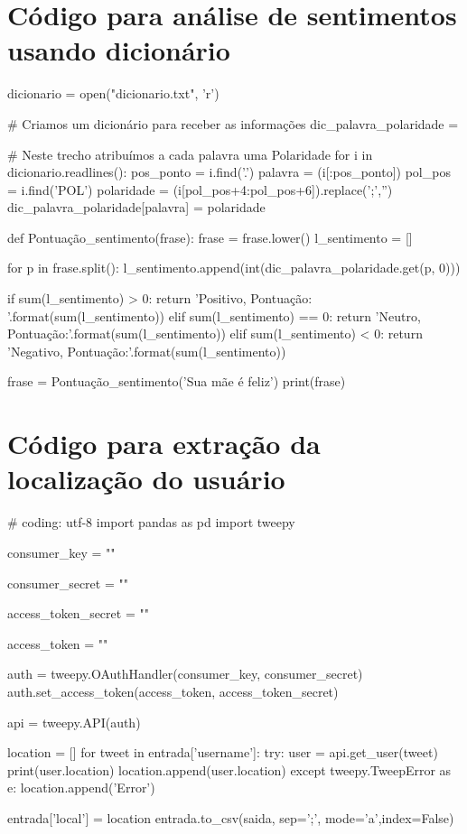 \section{Código para análise de sentimentos usando dicionário}
\label{cod:analise}

\begin{python}

dicionario = open("dicionario.txt", 'r')

# Criamos um dicionário para receber as informações
dic_palavra_polaridade = {} 

# Neste trecho atribuímos a cada palavra uma Polaridade
for i in dicionario.readlines(): 
    pos_ponto = i.find('.')
    palavra = (i[:pos_ponto])
    pol_pos = i.find('POL')
    polaridade = (i[pol_pos+4:pol_pos+6]).replace(';','')
    dic_palavra_polaridade[palavra] = polaridade


def Pontuação_sentimento(frase):
    frase = frase.lower()
    l_sentimento = []

    for p in frase.split():
        l_sentimento.append(int(dic_palavra_polaridade.get(p, 0)))

    if sum(l_sentimento) > 0:
        return 'Positivo, Pontuação: {}'.format(sum(l_sentimento))
    elif sum(l_sentimento) == 0:
        return 'Neutro, Pontuação:{}'.format(sum(l_sentimento))
    elif sum(l_sentimento) < 0:
        return 'Negativo, Pontuação:{}'.format(sum(l_sentimento))


frase = Pontuação_sentimento('Sua mãe é feliz')
print(frase)
\end{python}
\section{Código para extração da localização do usuário}
\label{cod:geo}
\begin{python}
    # coding: utf-8
    import pandas as pd  
    import tweepy
    
    consumer_key = ""
    
    consumer_secret = ""
    
    access_token_secret = ""
    
    access_token = ""
    
    auth = tweepy.OAuthHandler(consumer_key, consumer_secret)
    auth.set_access_token(access_token, access_token_secret)
    
    api = tweepy.API(auth)

    location = []
    for tweet in entrada['username']:
        try:
            user = api.get_user(tweet)
            print(user.location)
            location.append(user.location)
        except tweepy.TweepError as e:
            location.append('Error')

    entrada['local'] = location
    entrada.to_csv(saida, sep=';', mode='a',index=False)
    
    
    \end{python}

